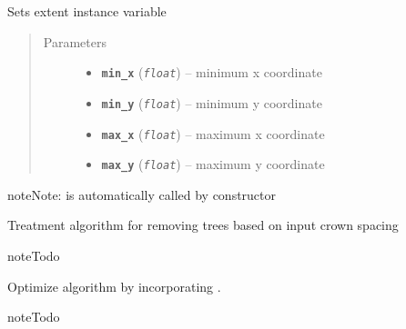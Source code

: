 \documentclass[letterpaper,10pt,english]{sphinxmanual}
\begin{document}
\begin{fulllineitems}
\begin{fulllineitems}
\end{fulllineitems}


\begin{fulllineitems}
\label{SpaceCrowns:intervene.SpaceCrowns.set_extent}
Sets extent instance variable
\begin{quote}\begin{description}
\item[{Parameters}] \leavevmode\begin{itemize}
\item {} 
\textbf{\texttt{min\_x}} (\emph{\texttt{float}}) -- minimum x coordinate

\item {} 
\textbf{\texttt{min\_y}} (\emph{\texttt{float}}) -- minimum y coordinate

\item {} 
\textbf{\texttt{max\_x}} (\emph{\texttt{float}}) -- maximum x coordinate

\item {} 
\textbf{\texttt{max\_y}} (\emph{\texttt{float}}) -- maximum y coordinate

\end{itemize}

\end{description}\end{quote}

\begin{notice}{note}{Note:}
 is automatically called by 
constructor
\end{notice}

\end{fulllineitems}


\begin{fulllineitems}
\label{SpaceCrowns:intervene.SpaceCrowns.treat}
Treatment algorithm for removing trees based on input crown spacing

\begin{notice}{note}{Todo}

Optimize algorithm by incorporating .
\end{notice}

\begin{notice}{note}{Todo}


\end{notice}
\end{fulllineitems}
\end{fulllineitems}
\end{document}
